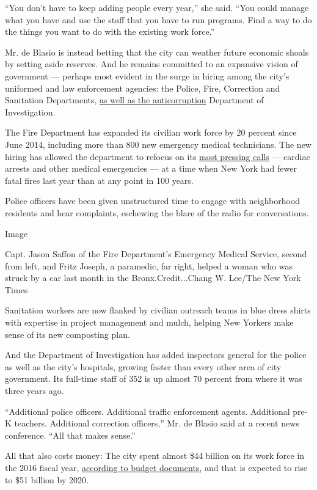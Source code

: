 ``You don't have to keep adding people every year,'' she said. ``You
could manage what you have and use the staff that you have to run
programs. Find a way to do the things you want to do with the existing
work force.''

Mr. de Blasio is instead betting that the city can weather future
economic shoals by setting aside reserves. And he remains committed to
an expansive vision of government --- perhaps most evident in the surge
in hiring among the city's uniformed and law enforcement agencies: the
Police, Fire, Correction and Sanitation Departments,
\href{https://www.nytimes3xbfgragh.onion/2017/05/22/nyregion/new-york-jails-staffing.html}{as
well as the anticorruption} Department of Investigation.

The Fire Department has expanded its civilian work force by 20 percent
since June 2014, including more than 800 new emergency medical
technicians. The new hiring has allowed the department to refocus on its
\href{https://cbcny.org/advocacy/cbc-report-calls-transforming-fdnys-response-medical-emergencies}{most
pressing calls} --- cardiac arrests and other medical emergencies --- at
a time when New York had fewer fatal fires last year than at any point
in 100 years.

Police officers have been given unstructured time to engage with
neighborhood residents and hear complaints, eschewing the blare of the
radio for conversations.

Image

Capt. Jason Saffon of the Fire Department's Emergency Medical Service,
second from left, and Fritz Joseph, a paramedic, far right, helped a
woman who was struck by a car last month in the Bronx.Credit...Chang W.
Lee/The New York Times

Sanitation workers are now flanked by civilian outreach teams in blue
dress shirts with expertise in project management and mulch, helping New
Yorkers make sense of its new composting plan.

And the Department of Investigation has added inspectors general for the
police as well as the city's hospitals, growing faster than every other
area of city government. Its full-time staff of 352 is up almost 70
percent from where it was three years ago.

``Additional police officers. Additional traffic enforcement agents.
Additional pre-K teachers. Additional correction officers,'' Mr. de
Blasio said at a recent news conference. ``All that makes sense.''

All that also costs money: The city spent almost \$44 billion on its
work force in the 2016 fiscal year,
\href{http://www1.nyc.gov/assets/omb/downloads/pdf/exec17-fp.pdf}{according
to budget documents}, and that is expected to rise to \$51 billion by
2020.

